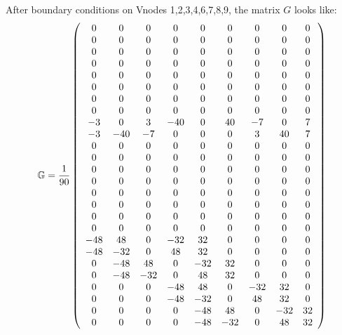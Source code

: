 After boundary conditions on Vnodes 1,2,3,4,6,7,8,9, the matrix $G$ looks like:
\[
{\mathbb{G}}=
\frac{1}{90}
\left(
\begin{array}{ccccccccc}
  0  &   0 &   0 &   0 &   0 &    0 &   0 &   0 &   0 \\ 
  0  &   0 &   0 &   0 &   0 &    0 &   0 &   0 &   0 \\ 
  0  &   0 &   0 &   0 &   0 &    0 &   0 &   0 &   0 \\ 
  0  &   0 &   0 &   0 &   0 &    0 &   0 &   0 &   0 \\ 
  0  &   0 &   0 &   0 &   0 &    0 &   0 &   0 &   0 \\ 
  0  &   0 &   0 &   0 &   0 &    0 &   0 &   0 &   0 \\ 
  0  &   0 &   0 &   0 &   0 &    0 &   0 &   0 &   0 \\ 
  0  &   0 &   0 &   0 &   0 &    0 &   0 &   0 &   0 \\ 
 -3  &   0 &   3 & -40 &   0 &   40 &  -7 &   0 &   7 \\ 
 -3  & -40 &  -7 &   0 &   0 &    0 &   3 &  40 &   7 \\ 
  0  &   0 &   0 &   0 &   0 &    0 &   0 &   0 &   0 \\ 
  0  &   0 &   0 &   0 &   0 &    0 &   0 &   0 &   0 \\ 
  0  &   0 &   0 &   0 &   0 &    0 &   0 &   0 &   0 \\ 
  0  &   0 &   0 &   0 &   0 &    0 &   0 &   0 &   0 \\ 
  0  &   0 &   0 &   0 &   0 &    0 &   0 &   0 &   0 \\ 
  0  &   0 &   0 &   0 &   0 &    0 &   0 &   0 &   0 \\ 
  0  &   0 &   0 &   0 &   0 &    0 &   0 &   0 &   0 \\ 
  0  &   0 &   0 &   0 &   0 &    0 &   0 &   0 &   0 \\ 
-48  &  48 &   0 & -32 &  32 &    0 &   0 &   0 &   0 \\ 
-48  & -32 &   0 &  48 &  32 &    0 &   0 &   0 &   0 \\ 
  0  & -48 &  48 &   0 & -32 &   32 &   0 &   0 &   0 \\ 
  0  & -48 & -32 &   0 &  48 &   32 &   0 &   0 &   0 \\ 
  0  &   0 &   0 & -48 &  48 &    0 & -32 &  32 &   0 \\ 
  0  &   0 &   0 & -48 & -32 &    0 &  48 &  32 &   0 \\ 
  0  &   0 &   0 &   0 & -48 &   48 &   0 & -32 &  32 \\ 
  0  &   0 &   0 &   0 & -48 &  -32 &   0 &  48 &  32 
\end{array}
\right)
\]
